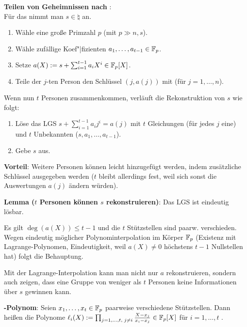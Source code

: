 \textbf{Teilen von Geheimnissen nach }:\\
Für das  nimmt man $s \in \natural$ an.
\begin{enumerate}
    \item
    Wähle eine große Primzahl $p$ (mit $p \gg n, s$).
    
    \item
    Wähle zufällige Koef"|fizienten $a_1, \dotsc, a_{t-1} \in \mathbb{F}_p$.
    
    \item
    Setze $a(X) := s + \sum_{i=1}^{t-1} a_i X^i \in \mathbb{F}_p[X]$.
    
    \item
    Teile der $j$-ten Person den Schlüssel $(j, a(j))$ mit (für $j = 1, \dotsc, n$).
\end{enumerate}
Wenn nun $t$ Personen zusammenkommen, verläuft die Rekonstruktion von $s$ wie folgt:
\begin{enumerate}
    \item
    Löse das LGS $s + \sum_{i=1}^{t-1} a_i j^i = a(j)$ mit $t$ Gleichungen
    (für jedes $j$ eine) und $t$ Unbekannten ($s, a_1, \dotsc, a_{t-1}$).
    
    \item
    Gebe $s$ aus.
\end{enumerate}

\textbf{Vorteil}:
Weitere Personen können leicht hinzugefügt werden, indem zusätzliche Schlüssel ausgegeben werden
($t$ bleibt allerdings fest, weil sich sonst die Auswertungen $a(j)$ ändern würden).

\textbf{Lemma ($t$ Personen können $s$ rekonstruieren)}:
Das LGS ist eindeutig lösbar.

\begin{Beweis}
    Es gilt $\deg(a(X)) \le t - 1$ und die $t$ Stützstellen sind paarw. verschieden.
    Wegen eindeutig möglicher Polynominterpolation im Körper $\mathbb{F}_p$
    (Existenz mit Lagrange-Polynomen, Eindeutigkeit, weil $a(X) \not= 0$
    höchstens $t - 1$ Nullstellen hat) folgt die Behauptung.
\end{Beweis}

\linie

Mit der Lagrange-Interpolation kann man nicht nur $a$ rekonstruieren,
sondern auch zeigen, dass eine Gruppe von weniger als $t$ Personen keine
Informationen über $s$ gewinnen kann.

\textbf{-Polynom}:
Seien $x_1, \dotsc, x_t \in \mathbb{F}_p$ paarweise verschiedene Stützstellen.
Dann heißen die Polynome
$\ell_i(X) := \prod_{j=1,\dotsc,t,\;j\not=i} \frac{X - x_j}{x_i - x_j} \in \mathbb{F}_p[X]$
für $i = 1, \dotsc, t$ .

